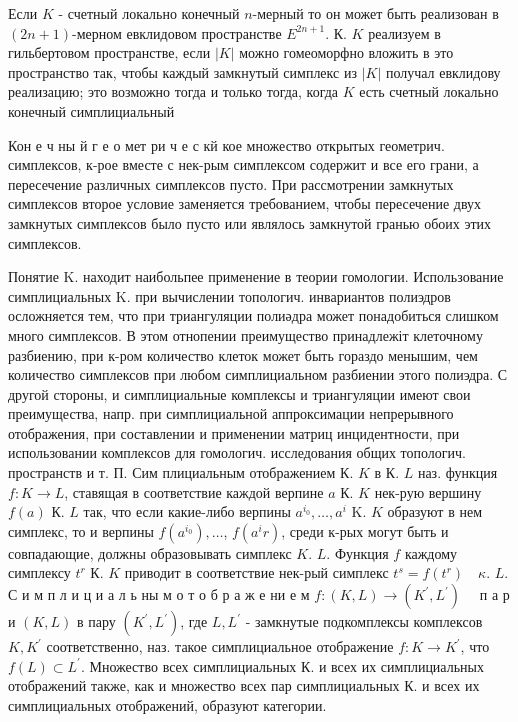 \documentclass[10pt]{article}
\begin{document}
Если $K$ - счетный локально конечный $n$-мерный то он может быть реализован в $(2 n+1)$-мерном евклидовом пространстве $E^{2 n+1}$. К. $K$ реализуем в гильбертовом пространстве, если $|K|$ можно гомеоморфно вложить в это пространство так, чтобы каждый замкнутый симплекс из $|K|$ получал евклидову реализацию; это возможно тогда и только тогда, когда $K$ есть счетный локально конечный симплициальный



Кон е ч ны й $г$ е о мет ри ч е с кй кое множество открытых геометрич. симплексов, к-рое вместе с нек-рым симплексом содержит и все его грани, а пересечение различных симплексов пусто. При рассмотрении замкнутых симплексов второе условие заменяется требованием, чтобы пересечение двух замкнутых симплексов было пусто или являлось замкнутой гранью обоих этих симплексов.



Понятие $\mathrm{K}$. находит наибольпее применение в теории гомологии. Использование симплициальных $\mathrm{K}$. при вычислении топологич. инвариантов полиэдров осложняется тем, что при триангуляции полиәдра может понадобиться слишком много симплексов. В этом отнопении преимущество принадлежіт клеточному разбиению, при к-ром количество клеток может быть гораздо менышим, чем количество симплексов при любом симплициальном разбиении этого полиэдра. С другой стороны, и симплициальные комплексы и триангуляции имеют свои преимущества, напр. при симплициальной аппроксимации непрерывного отображения, при составлении и применении матриц инцидентности, при использовании комплексов для гомологич. исследования общих топологич. пространств и т. П. Сим плициальным отображением К. $K$ в К. $L$ наз. функция $f: K \rightarrow L$, ставящая в соответствие каждой верпине $a$ К. $K$ нек-рую вершину $f(a)$ К. $L$ так, что если какие-либо верпины $a^{i_{0}}, \ldots, a^{i}$ K. $K$ образуют в нем симплекс, то и верпины $f\left(a^{i_{0}}\right), \ldots$, $f\left(a^{i} r\right)$, среди к-рых могут быть и совпадающие, должны образовывать симплекс $K$. $L$. Функция $f$ каждому симплексу $t^{r}$ К. $K$ приводит в соответствие нек-рый симплекс $t^{s}=f\left(t^{r}\right) \quad \kappa$. $L$. С и м п л и ц и а л ь ны м о т о б р а ж е ни е м $f:(K, L) \rightarrow\left(K^{\prime}, L^{\prime}\right) \quad$ п а р и $(K, L)$ в пару $\left(K^{\prime}, L^{\prime}\right)$, где $L, L^{\prime}$ - замкнутые подкомплексы комплексов $K, K^{\prime}$ соответственно, наз. такое симплициальное отображение $f: K \rightarrow K^{\prime}$, что $f(L) \subset L^{\prime}$. Множество всех симплициальных $К$. и всех их симплициальных отображений также, как и множество всех пар симплициальных К. и всех их симплициальных отображений, образуют категории.
\end{document}
